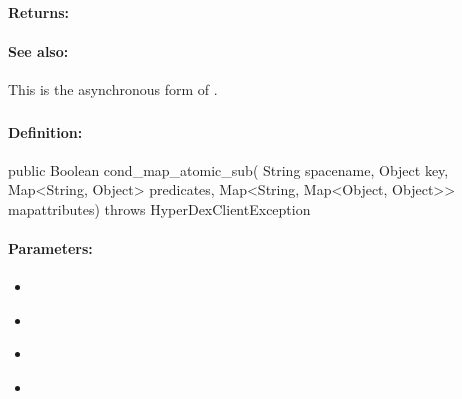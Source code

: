 \paragraph{Returns:}


\paragraph{See also:}  This is the asynchronous form of .

\pagebreak
\subsubsection{}
\label{api:java:cond_map_atomic_sub}


\paragraph{Definition:}
\begin{javacode}
public Boolean cond_map_atomic_sub(
        String spacename,
        Object key,
        Map<String, Object> predicates,
        Map<String, Map<Object, Object>> mapattributes) throws HyperDexClientException
\end{javacode}

\paragraph{Parameters:}
\begin{itemize}[noitemsep]
\item {}\\

\item {}\\

\item {}\\

\item {}\\

\end{itemize}

